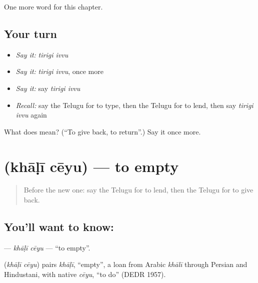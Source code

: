 \begin{grammarlens}[title={What you've built}]
One more word for this chapter.
\end{grammarlens}

\subsection*{Your turn}
\begin{itemize}
\raggedright
  \item \emph{Say it:} \emph{tirigi ivvu}
  \item \emph{Say it:} \emph{tirigi ivvu}, once more
  \item \emph{Say it:} say \emph{tirigi ivvu}
  \item \emph{Recall:} say the Telugu for to type, then the Telugu for to lend, then say \emph{tirigi ivvu} again
\end{itemize}

\begin{tcolorbox}[breakable,colback=teal!4,colframe=teal!35!black,title={Before you move on}]
What does   mean? (\textquotedblleft{}To give back, to return\textquotedblright{}.) Say it once more.
\end{tcolorbox}
\section[\texorpdfstring{\te{ఖాళీ} \te{చేయు} (khāḷī cēyu)}{ఖాళీ చేయు (khāḷī cēyu)}]{  (khāḷī cēyu) — to empty}

\label{lesson:TE-C246-khali-ceyu}



\begin{quote}
Before the new one: say the Telugu for to lend, then the Telugu for to give back.
\end{quote}

\subsection*{You'll want to know:  }
\textbf{ } — \emph{khāḷī cēyu} — \textquotedblleft{}to empty\textquotedblright{}.

\begin{cousinweb}
\textbf{ } (\emph{khāḷī cēyu}) pairs \emph{khāḷī}, \textquotedblleft{}empty\textquotedblright{}, a loan from Arabic \emph{khālī} through Persian and Hindustani, with native \emph{cēyu}, \textquotedblleft{}to do\textquotedblright{} (DEDR 1957).
\end{cousinweb}

